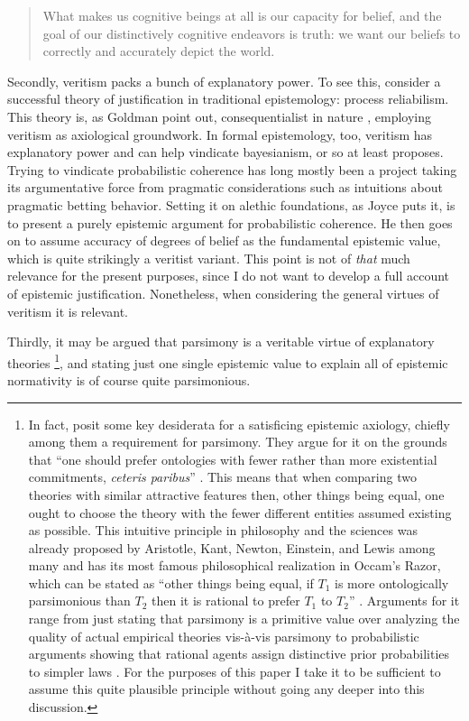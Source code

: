 \documentclass[12pt,numbers=noenddot]{scrartcl}
\begin{document}
\begin{quote}
What makes us cognitive beings at all is our capacity for belief, and the goal of our distinctively cognitive endeavors is truth: we want our beliefs to correctly and accurately depict the world. \textcite[7]{Bonjour1985}
\end{quote}

Secondly, veritism packs a bunch of explanatory power. To see this, consider a successful theory of justification in traditional epistemology: process reliabilism. This theory is, as Goldman point out, consequentialist in nature \autocite{Goldman2002-GOLTUO-2}, employing veritism as axiological groundwork. In formal epistemology, too, veritism has explanatory power and can help vindicate bayesianism, or so at least \textcite{Joyce2009-JOYAAC} proposes. Trying to vindicate probabilistic coherence has long mostly been a project taking its argumentative force from pragmatic considerations such as intuitions about pragmatic betting behavior. Setting it on alethic foundations, as Joyce puts it, is to present a purely epistemic argument for probabilistic coherence. He then goes on to assume accuracy of degrees of belief as the fundamental epistemic value, which is quite strikingly a veritist variant. This point is not of \emph{that} much relevance for the present purposes, since I do not want to develop a full account of epistemic justification. Nonetheless, when considering the general virtues of veritism it is relevant.

Thirdly, it may be argued that parsimony is a veritable virtue of explanatory theories \footnote{In fact, \textcite[342]{Ahlstrom-Vij2013} posit some key desiderata for a satisficing epistemic axiology, chiefly among them a requirement for parsimony. They argue for it on the grounds that “one should prefer ontologies with fewer rather than more existential commitments, \emph{ceteris paribus}” \autocite{Ahlstrom-Vij2013}. This means that when comparing two theories with similar attractive features then, other things being equal, one ought to choose the theory with the fewer different entities assumed existing as possible. This intuitive principle in philosophy and the sciences was already proposed by Aristotle, Kant, Newton, Einstein, and Lewis among many \autocite[3]{sep-simplicity} and has its most famous philosophical realization in Occam's Razor, which can be stated as “other things being equal, if $T_1$ is more ontologically parsimonious than $T_2$ then it is rational to prefer $T_1$ to $T_2$” \autocite[7]{sep-simplicity}. Arguments for it range from just stating that parsimony is a primitive value over analyzing the quality of actual empirical theories vis-à-vis parsimony to probabilistic arguments showing that rational agents assign distinctive prior probabilities to simpler laws \autocite[11-26]{sep-simplicity}. For the purposes of this paper I take it to be sufficient to assume this quite plausible principle without going any deeper into this discussion.},
and stating just one single epistemic value to explain all of epistemic normativity is of course quite parsimonious.
\end{document}
